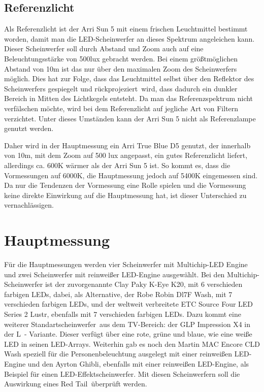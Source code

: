 

\section{Referenzlicht}
\label{sec_reflicht}
Als Referenzlicht ist der Arri Sun 5 mit einem frischen Leuchtmittel bestimmt worden, damit man die LED-Scheinwerfer an dieses Spektrum angeleichen kann. Dieser Scheinwerfer soll durch Abstand und Zoom auch auf eine Beleuchtungsstärke von 500lux gebracht werden. Bei einem größtmöglichen Abstand von 10m ist das nur über den maximalen Zoom des Scheinwerfers möglich. Dies hat zur Folge, dass das Leuchtmittel selbst über den Reflektor des Scheinwerfers gespiegelt und \glqq rückprojeziert\grqq\ wird, dass dadurch ein dunkler Bereich in Mitten des Lichtkegels entsteht. Da man das Referenzspektrum nicht verfälschen möchte, wird bei dem Referenzlicht auf jegliche Art von Filtern verzichtet. Unter dieses Umständen kann der Arri Sun 5 nicht als Referenzlampe genutzt werden.

Daher wird in der Hauptmessung ein Arri True Blue D5 genutzt, der innerhalb von 10m, mit dem Zoom auf 500 lux angepasst, ein gutes Referenzlicht liefert, allerdings ca. 600K wärmer als der Arri Sun 5 ist. So kommt es, dass die Vormessungen auf 6000K, die Hauptmessung jedoch auf 5400K eingemessen sind. Da nur die Tendenzen der Vormessung eine Rolle spielen und die Vormessung keine direkte Einwirkung auf die Hauptmessung hat, ist dieser Unterschied zu vernachlässigen.


\chapter{Hauptmessung}
Für die Hauptmessungen werden vier Scheinwerfer mit Multichip-LED Engine und zwei Scheinwerfer mit reinweißer LED-Engine ausgewählt. Bei den Multichip-Scheinwerfer ist der zuvorgenannte Clay Paky K-Eye K20, mit 6 verschieden farbigen LEDs, dabei, als Alternative, der Robe Robin Dl7F Wash, mit 7 verschieden farbigen LEDs, und der weltweit verbreitete ETC Source Four LED Series 2 Lustr, ebenfalls mit 7 verschieden farbigen LEDs. Dazu kommt eine weiterer \glqq Standartscheinwerfer\grqq\ aus dem TV-Bereich: der GLP Impression X4 in der \glqq L\grqq\ - Variante. Dieser verfügt über eine rote, grüne und blaue, wie eine weiße LED in seinen LED-Arrays. Weiterhin gab es noch den Martin MAC Encore CLD Wash speziell für die Personenbeleuchtung ausgelegt mit einer reinweißen LED-Engine und den Ayrton Ghibli, ebenfalls mit einer reinweißen LED-Engine, als Beispiel für einen LED-Effektscheinwerfer. 
Mit diesen Scheinwerfern soll die Auswirkung eines \glqq Red Tail\grqq\ überprüft werden.



